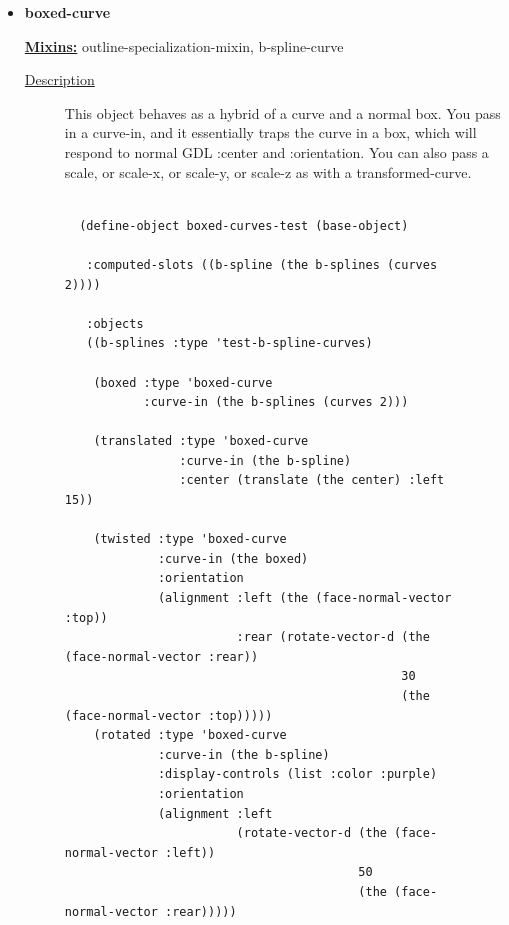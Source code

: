 \documentclass [11pt]{book}
\begin{document}
\begin{itemize}
\item {}
\label{prim:boxed-curve}
\textbf{boxed-curve}


\textbf{
\underline{Mixins:}} outline-specialization-mixin, b-spline-curve





\begin{description}

\item [
\underline{Description}]


This object behaves as a hybrid of a curve 
and a normal box. You pass in a curve-in, and it essentially traps the curve 
in a box, which will respond to normal GDL :center and :orientation. 
You can also pass a scale, or scale-x, or scale-y, or scale-z as with
a transformed-curve.



\end{description}




\begin{figure}
\begin{lrbox}{\boxedverb}
\begin{minipage}{\linewidth}
{\small

\begin{verbatim}

  (define-object boxed-curves-test (base-object)
  
   :computed-slots ((b-spline (the b-splines (curves 2))))
  
   :objects
   ((b-splines :type 'test-b-spline-curves)
    
    (boxed :type 'boxed-curve
           :curve-in (the b-splines (curves 2)))
    
    (translated :type 'boxed-curve
                :curve-in (the b-spline)
                :center (translate (the center) :left 15))
    
    (twisted :type 'boxed-curve
             :curve-in (the boxed)
             :orientation 
             (alignment :left (the (face-normal-vector :top))
                        :rear (rotate-vector-d (the (face-normal-vector :rear))
                                               30
                                               (the (face-normal-vector :top)))))
    (rotated :type 'boxed-curve
             :curve-in (the b-spline)
             :display-controls (list :color :purple)
             :orientation 
             (alignment :left 
                        (rotate-vector-d (the (face-normal-vector :left))
                                         50
                                         (the (face-normal-vector :rear)))))
   

\end{verbatim}}
\end{minipage}
\end{lrbox}
\end{figure}
\end{itemize}
\end{document}
